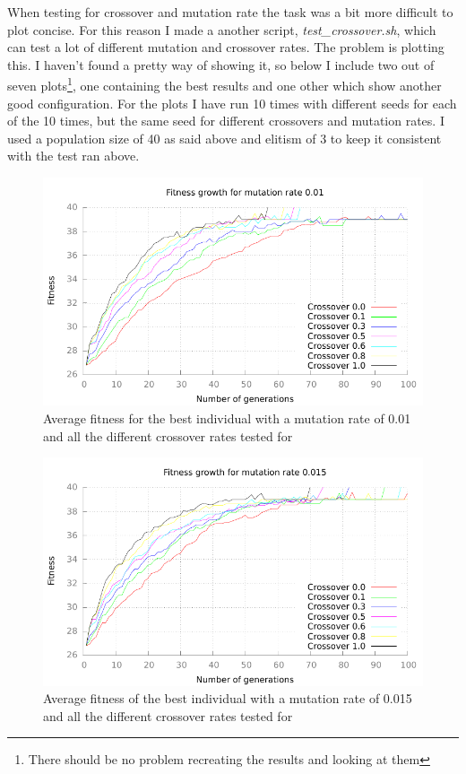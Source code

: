 When testing for crossover and mutation rate the task was a bit more difficult
to plot concise. For this reason I made a another script,
\textit{test\_crossover.sh}, which can test a lot of different mutation and
crossover rates. The problem is plotting this. I haven't found a pretty way of
showing it, so below I include two out of seven plots\footnote{There should be
no problem recreating the results and looking at them}, one containing the best
results and one other which show another good configuration. For the plots I have run
10 times with different seeds for each of the 10 times, but the same seed for
different crossovers and mutation rates. I used a population size of 40 as said
above and elitism of 3 to keep it consistent with the test ran above.

\begin{figure}[h!]
	\includegraphics{../graphs/fitness_crossover_mute_001_average.pdf}
	\caption{Average fitness for the best individual with a mutation rate of 0.01 and all the
	different crossover rates tested for}
	\label{fig:cross 0.01}
\end{figure}

\begin{figure}[h!]
	\includegraphics{../graphs/fitness_crossover_mute_0015_average.pdf}
	\caption{Average fitness of the best individual with a mutation rate of
		0.015 and all the different crossover rates tested for}
	\label{fig:cross 0.015}
\end{figure}


